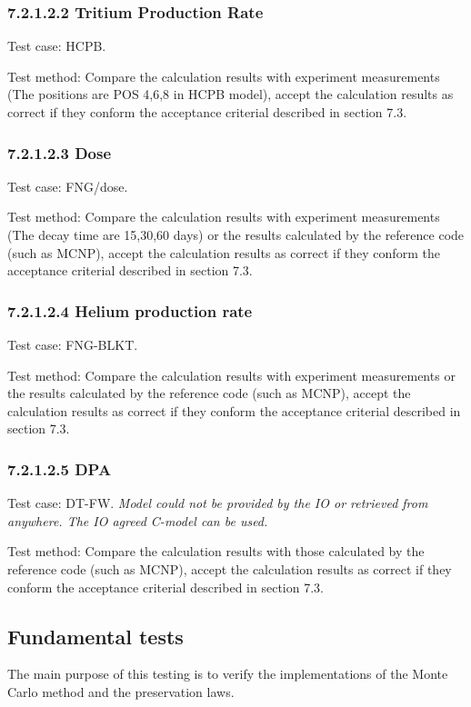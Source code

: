 \subsubsection{7.2.1.2.2 Tritium Production Rate}
Test case: HCPB.

Test method: Compare the calculation results with experiment measurements (The
positions are POS 4,6,8 in HCPB model), accept the calculation results as correct if
they conform the acceptance criterial described in section 7.3.

\subsubsection{7.2.1.2.3 Dose}
Test case: FNG/dose.

Test method: Compare the calculation results with experiment measurements (The
decay time are 15,30,60 days) or the results calculated by the reference code (such as
MCNP), accept the calculation results as correct if they conform the acceptance criterial
described in section 7.3.

\subsubsection{7.2.1.2.4 Helium production rate}
Test case: FNG-BLKT.

Test method: Compare the calculation results with experiment measurements or the
results calculated by the reference code (such as MCNP), accept the calculation results
as correct if they conform the acceptance criterial described in section 7.3.

\subsubsection{7.2.1.2.5 DPA}
Test case: DT-FW. \textit{Model could not be provided by the IO or retrieved from anywhere. The IO agreed C-model can be used.}

Test method: Compare the calculation results with those calculated by the reference
code (such as MCNP), accept the calculation results as correct if they conform the
acceptance criterial described in section 7.3.

\subsection{Fundamental tests}
The main purpose of this testing is to verify the implementations of the Monte Carlo method
and the preservation laws.

